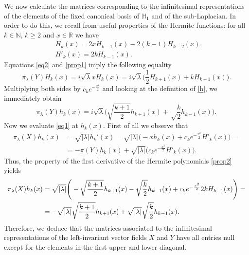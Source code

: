 \documentclass[12pt,oneside,a4paper]{book}
\numberwithin{equation}{section}     %
\theoremstyle{plain}
\theoremstyle{definition}
\newcommand{\N}{{\mathbb N}}
\newcommand{\R}{{\mathbb R}}
\begin{document}
We now calculate the matrices corresponding to the infinitesimal representations of the elements of the fixed canonical basis of $\mathbb H_1$ and of the sub-Laplacian. In order to do this, we recall from \cite{S1975} useful properties of the Hermite functions: for all $k\in\N, \,k\geq2$ and $x\in\R$ we have
\begin{subequations}
	\label{prop}
	\begin{align}
	&H_k(x)=2 x H_{k-1}(x)-2(k-1)H_{k-2}(x),\label{prop1}\\
	&H'_k(x)=2kH_{k-1}(x)\label{prop2}.
	\end{align}
\end{subequations}
Equations \eqref{eq2} and \eqref{prop1} imply the following equality
\[
\pi_\lambda (Y)H_k(x)=i\sqrt\lambda x H_k(x)=i\sqrt\lambda\Big(\frac{1}{2}H_{k+1}(x)+kH_{k-1}(x)\Big).
\]
Multiplying both sides by $c_ke^{-\frac{x^2}{2}}$ and looking at the definition of \eqref{h}, we immediately obtain
\begin{equation}\label{mol}
\pi_\lambda(Y)h_k(x)=i\sqrt{\lambda}\Bigg(\sqrt{\frac{k+1}{2}}h_{k+1}(x)+\sqrt\frac{k}{2}h_{k-1}(x)\Bigg).
\end{equation}
Now we evaluate \eqref{eq1} at $h_k(x)$. First of all we observe that 
\begin{align*}
\pi_{\lambda}(X)h_k(x)&=\sqrt{|\lambda|}h_k'(x)=\sqrt{|\lambda|}\big(-xh_k(x)+c_ke^{-\frac{x^2}{2}}H'_k(x)\big)=\\
&=-\pi(Y)h_k(x)+\sqrt{|\lambda|}\big(c_ke^{-\frac{x^2}{2}}H'_k(x)\big).
\end{align*}
Thus, the property of the first derivative of the Hermite polynomials  \eqref{prop2} yields
\begin{align}\notag
\pi_{\lambda}(X)h_k(x)&=\sqrt{|\lambda|}\Bigg(-\sqrt{\frac{k+1}{2}}h_{k+1}(x)-\sqrt\frac{k}{2}h_{k-1}(x)+c_ke^{-\frac{x^2}{2}}2kH_{k-1}(x)\Bigg)=\\
&=-\sqrt{|\lambda|}\sqrt\frac{k+1}{2}h_{k+1}(x)+\sqrt{|\lambda|}\sqrt{\frac{k}{2}}h_{k-1}(x).\label{EQ:der}
\end{align}
Therefore, we deduce that the matrices associated to the infinitesimal representations of the left-invariant vector fields $X$ and $Y$ have all entries null except for the elements in the first upper and lower diagonal.
\end{document}
